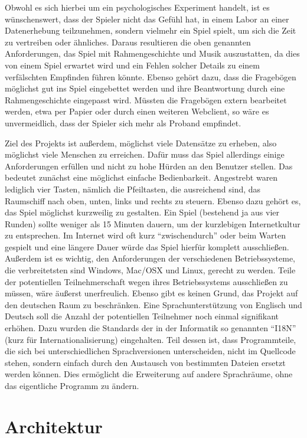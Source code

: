 \documentclass[a4paper,12pt]{scrartcl}
\begin{document}
Obwohl es sich hierbei um ein psychologisches Experiment handelt, ist es wünschenswert,
dass der Spieler nicht das Gefühl hat, in einem Labor an einer Datenerhebung
teilzunehmen, sondern vielmehr ein Spiel spielt, um sich die Zeit zu vertreiben oder
ähnliches. Daraus resultieren die oben genannten Anforderungen, das Spiel mit
Rahmengeschichte und Musik auszustatten, da dies von einem Spiel erwartet wird und
ein Fehlen solcher Details zu einem verfälschten Empfinden führen könnte. Ebenso
gehört dazu, dass die Fragebögen möglichst gut ins Spiel eingebettet werden und ihre
Beantwortung durch eine Rahmengeschichte eingepasst wird. Müssten die Fragebögen
extern bearbeitet werden, etwa per Papier oder durch einen weiteren Webclient, so wäre es
unvermeidlich, dass der Spieler sich mehr als Proband empfindet.

Ziel des Projekts ist außerdem, möglichst viele Datensätze zu erheben, also möglichst viele
Menschen zu erreichen. Dafür muss das Spiel allerdings einige Anforderungen erfüllen
und nicht zu hohe Hürden an den Benutzer stellen. Das bedeutet zunächst eine möglichst
einfache Bedienbarkeit. Angestrebt waren lediglich vier Tasten, nämlich die Pfeiltasten, die ausreichend sind, das Raumschiff nach oben, unten, links und rechts zu steuern. Ebenso
dazu gehört es, das Spiel möglichst kurzweilig zu gestalten. Ein Spiel (bestehend ja aus
vier Runden) sollte weniger als 15 Minuten dauern, um der kurzlebigen Internetkultur zu
entsprechen. Im Internet wird oft kurz "`zwischendurch"' oder beim Warten gespielt und eine
längere Dauer würde das Spiel hierfür komplett ausschließen. Außerdem ist es wichtig, den
Anforderungen der verschiedenen Betriebssysteme, die verbreitetsten sind Windows, Mac/OSX und Linux, gerecht zu werden. Teile der potentiellen Teilnehmerschaft wegen ihres
Betriebssystems ausschließen zu müssen, wäre äußerst unerfreulich. Ebenso gibt es keinen
Grund, das Projekt auf den deutschen Raum zu beschränken. Eine Sprachunterstützung
von Englisch und Deutsch soll die Anzahl der potentiellen Teilnehmer noch einmal
signifikant erhöhen. Dazu wurden die Standards der in der Informatik so genannten "`I18N"'
(kurz für Internationalisierung) eingehalten. Teil dessen ist, dass Programmteile, die sich
bei unterschiedlichen Sprachversionen unterscheiden, nicht im Quellcode stehen, sondern
einfach durch den Austausch von bestimmten Dateien ersetzt werden können. Dies
ermöglicht die Erweiterung auf andere Sprachräume, ohne das eigentliche Programm zu
ändern.

\section{Architektur}
\end{document}
